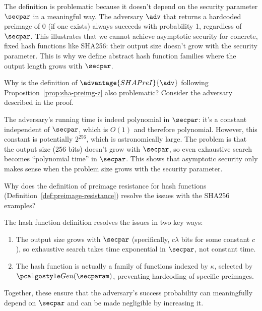 \ifsolutions
\begin{mysolution}
  The definition is problematic because it doesn't depend on the security parameter $\secpar$ in a meaningful way.
  The adversary $\adv$ that returns a hardcoded preimage of 0 (if one exists) always succeeds with probability 1, regardless of $\secpar$.
  This illustrates that we cannot achieve asymptotic security for concrete, fixed hash functions like SHA256: their output size doesn't grow with the security parameter.
  This is why we define abstract hash function families where the output length grows with $\secpar$.
\end{mysolution}
\fi

\begin{exercise}\label{ex:sha-random-preimage-problem}
  Why is the definition of $\advantage{SHAPreI}{\adv}$ following Proposition~\ref{prop:sha-preimg-z} also problematic?
  Consider the adversary described in the proof.
\end{exercise}

\ifsolutions
\begin{mysolution}
  The adversary's running time is indeed polynomial in $\secpar$: it's a constant independent of $\secpar$, which is $O(1)$ and therefore polynomial.
  However, this constant is potentially $2^{256}$, which is astronomically large.
  The problem is that the output size (256 bits) doesn't grow with $\secpar$, so even exhaustive search becomes ``polynomial time'' in $\secpar$.
  This shows that asymptotic security only makes sense when the problem size grows with the security parameter.
\end{mysolution}
\fi

\begin{exercise}\label{ex:hash-function-definition}
  Why does the definition of preimage resistance for hash functions (Definition~\ref{def:preimage-resistance}) resolve the issues with the SHA256 examples?
\end{exercise}

\ifsolutions
\begin{mysolution}
  The hash function definition resolves the issues in two key ways:
  \begin{enumerate}
    \item The output size grows with $\secpar$ (specifically, $c\lambda$ bits for some constant $c$), so exhaustive search takes time exponential in $\secpar$, not constant time.
    \item The hash function is actually a family of functions indexed by $\kappa$, selected by $\algo{Gen}(\secparam)$, preventing hardcoding of specific preimages.
  \end{enumerate}
  Together, these ensure that the adversary's success probability can meaningfully depend on $\secpar$ and can be made negligible by increasing it.
\end{mysolution}
\fi

